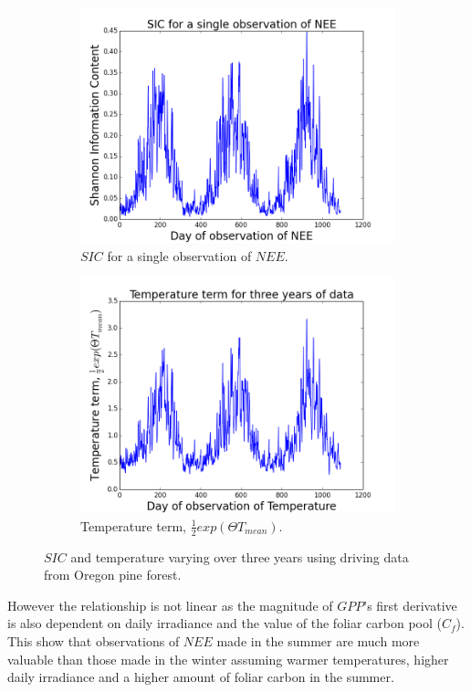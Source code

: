 \documentclass[11pt]{article}
\begin{document}
\begin{figure}[h]
\centering
\begin{subfigure}{.5\textwidth}
  \centering
  \includegraphics[width=.9\linewidth]{SIC1Obs_0_1095.png}
  \caption{$SIC$ for a single observation of $NEE$.}
  \label{fig:sub1}
\end{subfigure}%
\begin{subfigure}{.5\textwidth}
  \centering
  \includegraphics[width=.9\linewidth]{Temp_0_1095.png}
  \caption{Temperature term, $\frac{1}{2}exp(\Theta  T_{mean})$.}
  \label{fig:sub2}
\end{subfigure}
\caption{$SIC$ and temperature varying over three years using driving data from Oregon pine forest.}
\label{fig:SICNEET}
\end{figure}

However the relationship is not linear as the magnitude of $GPP$'s first derivative is also dependent on daily irradiance and the value of the foliar carbon pool ($C_f$). This show that observations of $NEE$ made in the summer are much more valuable than those made in the winter assuming warmer temperatures, higher daily irradiance and a higher amount of foliar carbon in the summer.
\end{document}
